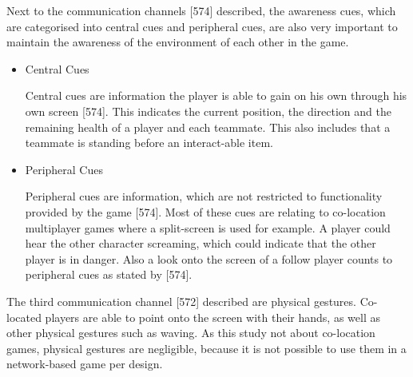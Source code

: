 Next to the communication channels \textcite{Cheung2012CommunicationGaming}[574] described, the awareness cues, which are categorised into central cues and peripheral cues, are also very important to maintain the awareness of the environment of each other in the game. 
\begin{itemize}
    \item Central Cues 
    
    Central cues are information the player is able to gain on his own through his own screen \autocite{Cheung2012CommunicationGaming}[574]. This indicates the current position, the direction and the remaining health of a player and each teammate. This also includes that a teammate is standing before an interact-able item.
    \item Peripheral Cues
    
    Peripheral cues are information, which are not restricted to functionality provided by the game \autocite{Cheung2012CommunicationGaming}[574]. Most of these cues are relating to co-location multiplayer games where a split-screen is used for example. A player could hear the other character screaming, which could indicate that the other player is in danger. Also a look onto the screen of a follow player counts to peripheral cues as stated by \textcite{Cheung2012CommunicationGaming}[574].
\end{itemize}

The third communication channel \textcite{Cheung2012CommunicationGaming}[572] described are physical gestures. Co-located players are able to point onto the screen with their hands, as well as other physical gestures such as waving. As this study not about co-location games, physical gestures are negligible, because it is not possible to use them in a network-based game per design.



